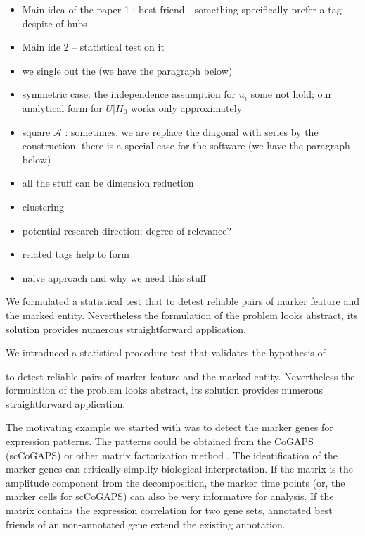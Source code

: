 \documentclass{llncs}
\begin{document}
\begin{itemize}
    \item Main idea of the paper 1 : best friend - something specifically prefer a tag despite of hubs
    \item Main ide 2 -- statistical test on it
    \item we single out the  (we have the paragraph below)
    \item symmetric case: the independence assumption for $u_i$ some not hold; our analytical form for $U | H_0$ works only approximately
    \item square $\mathcal{A}$ : sometimes, we are replace the diagonal with series by the construction, there is a special case for the software (we have the paragraph below)
    \item all the stuff can be dimension reduction
    \item clustering
    \item potential research direction: degree of relevance?
    \item related tags help to form 
    \item naive approach and why we need this stuff
\end{itemize}

We formulated a statistical test that to detest reliable pairs of marker feature and the marked entity. Nevertheless the formulation of the problem looks abstract, its solution provides numerous straightforward application. 

We introduced a statistical procedure test that
validates the hypothesis of 



to detest reliable pairs of marker feature and the marked entity. Nevertheless the formulation of the problem looks abstract, its solution provides numerous straightforward application. 





The motivating example we started with was to detect the marker genes for expression patterns. The patterns could be obtained from the CoGAPS (scCoGAPS) \cite{Fertig_2016} or other matrix factorization method \cite{Stein_2018}. The identification of the marker genes can critically simplify biological interpretation. If the matrix is the amplitude component from  the decomposition, the marker time points (or, the marker cells for scCoGAPS) can also be very informative for analysis. If the matrix contains the expression correlation for two gene sets, annotated best friends of an non-annotated gene extend the existing annotation.
\end{document}
